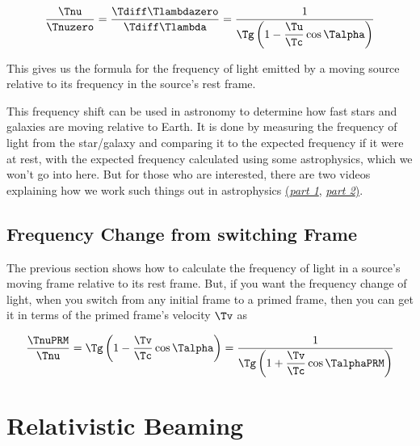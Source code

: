 \begin{equation}
	\label{eq: Doppler Effect}
	\frac{\Tnu }{\Tnuzero } = \frac{\Tdiff \Tlambdazero }{\Tdiff \Tlambda } = \frac{1}{ \Tg  \left(1-\dfrac{\Tu }{\Tc } \cos\Talpha  \right)}
\end{equation}

This gives us the formula for the frequency of light emitted by a moving source relative to its frequency in the source's rest frame.

This frequency shift can be used in astronomy to determine how fast stars and galaxies are moving relative to Earth.
It is done by measuring the frequency of light from the star/galaxy and comparing it to the expected frequency if it were at rest, with the expected frequency calculated using some astrophysics, which we won't go into here.
But for those who are interested, there are two videos explaining how we work such things out in astrophysics \href{https://www.youtube.com/watch?v=YdOXS_9_P4U}{(\textit{part 1}}, \href{https://www.youtube.com/watch?v=hFMaT9oRbs4}{\textit{part 2})}.

\subsection{Frequency Change from switching Frame}\label{subsect: Frequency Change from switching Frame}

The previous section shows how to calculate the frequency of light in a source's moving frame relative to its rest frame.
But, if you want the frequency change of light, when you switch from any initial frame to a primed frame, then you can get it in terms of the primed frame's velocity $\Tv $ as

\begin{equation}
	\frac{\TnuPRM }{\Tnu } = \Tg  \left(1-\dfrac{\Tv }{\Tc } \cos\Talpha  \right)  = \frac{1}{ \Tg  \left(1+\dfrac{\Tv }{\Tc } \cos\TalphaPRM  \right)}
\end{equation}



\section{Relativistic Beaming} \label{sect: Relativistic Beaming}

